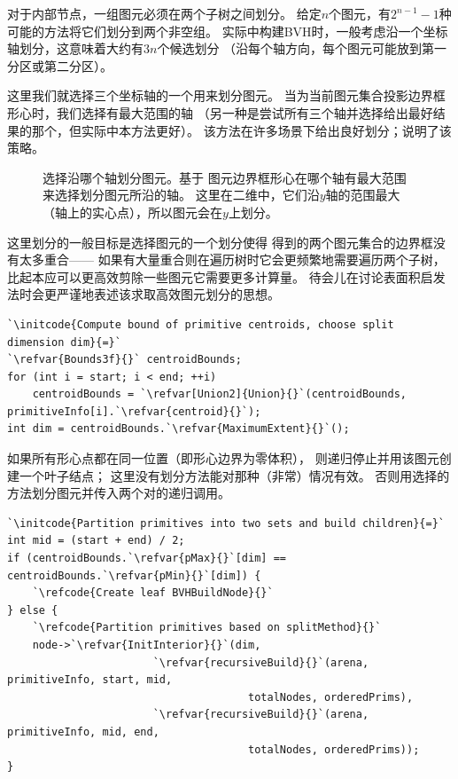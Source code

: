 对于内部节点，一组图元必须在两个子树之间划分。
给定$n$个图元，有$2^{n-1}-1$种
可能的方法将它们划分到两个非空组。
实际中构建BVH时，一般考虑沿一个坐标轴划分，这意味着大约有$3n$个候选划分
（沿每个轴方向，每个图元可能放到第一分区或第二分区）。

这里我们就选择三个坐标轴的一个用来划分图元。
当为当前图元集合投影边界框形心时，我们选择有最大范围的轴
（另一种是尝试所有三个轴并选择给出最好结果的那个，但实际中本方法更好）。
该方法在许多场景下给出良好划分；说明了该策略。
\begin{figure}[htbp]
    \centering
    \caption{选择沿哪个轴划分图元。\protect{}基于
        图元边界框形心在哪个轴有最大范围来选择划分图元所沿的轴。
        这里在二维中，它们沿$y$轴的范围最大（轴上的实心点），所以图元会在$y$上划分。}
    \label{fig:4.3}
\end{figure}

这里划分的一般目标是选择图元的一个划分使得
得到的两个图元集合的边界框没有太多重合——
如果有大量重合则在遍历树时它会更频繁地需要遍历两个子树，
比起本应可以更高效剪除一些图元它需要更多计算量。
待会儿在讨论表面积启发法时会更严谨地表述该求取高效图元划分的思想。
\begin{lstlisting}
`\initcode{Compute bound of primitive centroids, choose split dimension dim}{=}`
`\refvar{Bounds3f}{}` centroidBounds;
for (int i = start; i < end; ++i)
    centroidBounds = `\refvar[Union2]{Union}{}`(centroidBounds, primitiveInfo[i].`\refvar{centroid}{}`);
int dim = centroidBounds.`\refvar{MaximumExtent}{}`();
\end{lstlisting}

如果所有形心点都在同一位置（即形心边界为零体积），
则递归停止并用该图元创建一个叶子结点；
这里没有划分方法能对那种（非常）情况有效。
否则用选择的方法划分图元并传入两个对的递归调用。
\begin{lstlisting}
`\initcode{Partition primitives into two sets and build children}{=}`
int mid = (start + end) / 2;
if (centroidBounds.`\refvar{pMax}{}`[dim] == centroidBounds.`\refvar{pMin}{}`[dim]) {
    `\refcode{Create leaf BVHBuildNode}{}`
} else {
    `\refcode{Partition primitives based on splitMethod}{}`
    node->`\refvar{InitInterior}{}`(dim,
                       `\refvar{recursiveBuild}{}`(arena, primitiveInfo, start, mid,
                                      totalNodes, orderedPrims),
                       `\refvar{recursiveBuild}{}`(arena, primitiveInfo, mid, end,
                                      totalNodes, orderedPrims));
}
\end{lstlisting}

